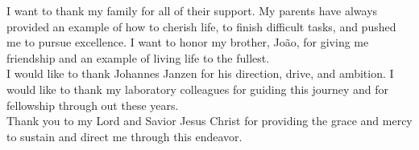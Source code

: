 I want to thank my family for all of their support. My parents have always
provided an example of how to cherish life, to finish difficult tasks, and pushed me to pursue excellence. I want to honor my brother, João, for giving me friendship and an example of living life to the fullest.\\
I would like to thank Johannes Janzen for his direction, drive, and ambition. I would like to thank my laboratory colleagues for guiding this journey and for fellowship through out these years.\\
Thank you to my Lord and Savior Jesus Christ for providing the grace and mercy
to sustain and direct me through this endeavor.